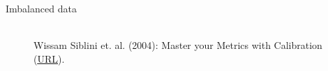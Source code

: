 \documentclass[11pt,compress,t,notes=noshow, xcolor=table]{beamer}
\begin{document}
\begin{vbframe}{Imbalanced data}
\begin{figure}
  \centering
  \tiny
  \\ Wissam Siblini et. al. (2004): Master your Metrics with Calibration
  (\href{https://arxiv.org/pdf/1909.02827.pdf}{\underline{URL}}).
\end{figure}

%

\end{vbframe}
\end{document}
